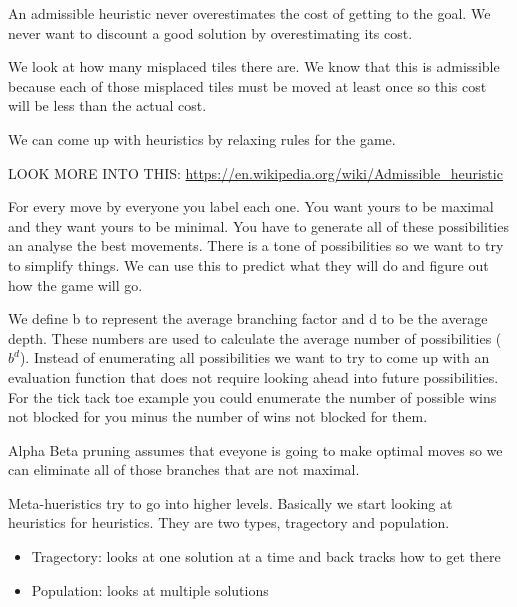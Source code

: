 \documentclass[12pt]{article}
\begin{document}

An admissible heuristic never overestimates the cost of getting to the goal. We never want to discount a good solution by overestimating its cost.


We look at how many misplaced tiles there are. We know that this is admissible because each of those misplaced tiles must be moved at least once so this cost will be less than the actual cost.


We can come up with heuristics by relaxing rules for the game. 

LOOK MORE INTO THIS: \url{https://en.wikipedia.org/wiki/Admissible_heuristic}


For every move by everyone you label each one. You want yours to be maximal and they want yours to be minimal. You have to generate all of these possibilities an analyse the best movements. There is a tone of possibilities so we want to try to simplify things. We can use this to predict what they will do and figure out how the game will go.


We define b to represent the average branching factor and d to be the average depth. These numbers are used to calculate the average number of possibilities ($b^d$). Instead of enumerating all possibilities we want to try to come up with an evaluation function that does not require looking ahead into future possibilities. For the tick tack toe example you could enumerate the number of possible wins not blocked for you minus the number of wins not blocked for them.


Alpha Beta pruning assumes that eveyone is going to make optimal moves so we can eliminate all of those branches that are not maximal.


Meta-hueristics try to go into higher levels. Basically we start looking at heuristics for heuristics. They are two types, tragectory and population.

\begin{itemize}
  \item Tragectory: looks at one solution at a time and back tracks how to get there
  \item Population: looks at multiple solutions
\end{itemize}
\end{document}
